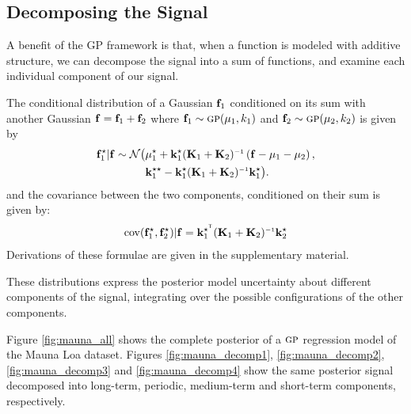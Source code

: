 \documentclass[twoside]{article}
\begin{document}


\subsection{Decomposing the Signal}

A benefit of the GP framework is that, when a function is modeled with additive structure, we can decompose the signal into a sum of functions, and examine each individual component of our signal.

The conditional distribution of a Gaussian ${\bf{f}}_1$ conditioned on its sum with another Gaussian ${\bf{f}} = {\bf{f}}_1 + {\bf{f}}_2$ where ${\bf{f}}_1 \sim {\textsc{gp}}( {\bf{\mu}}_1, k_1)$ and ${\bf{f}}_2 \sim {\textsc{gp}}( {\bf{\mu}}_2, k_2)$ is given by
\begin{align}
\vf_1^\star | \vf \sim \mathcal{N} \big( & \vmu_1^\star + \vk_1^\star (\vK_1 + \vK_2)\inv \left( \vf - \vmu_1 - \vmu_2 \right), \nonumber \\
& \vk_1^{\star\star} - \vk_1^\star (\vK_1 + \vK_2)\inv \vk_1^\star \big).
\end{align}
and the covariance between the two components, conditioned on their sum is given by:
\begin{align}
\cov(\vf_1^\star, \vf_2^\star) | \vf = \vk_1^{\star\tra} (\vK_1 + \vK_2)\inv \vk_2^\star
\end{align}
Derivations of these formulae are given in the supplementary material.

These distributions express the posterior model uncertainty about different components of the signal, integrating over the possible configurations of the other components.


Figure \ref{fig:mauna_all} shows the complete posterior of a ${\textsc{gp}}$ regression model of the Mauna Loa dataset.  Figures \ref{fig:mauna_decomp1}, \ref{fig:mauna_decomp2}, \ref{fig:mauna_decomp3} and \ref{fig:mauna_decomp4} show the same posterior signal decomposed into long-term, periodic, medium-term and short-term components, respectively.
\end{document}
